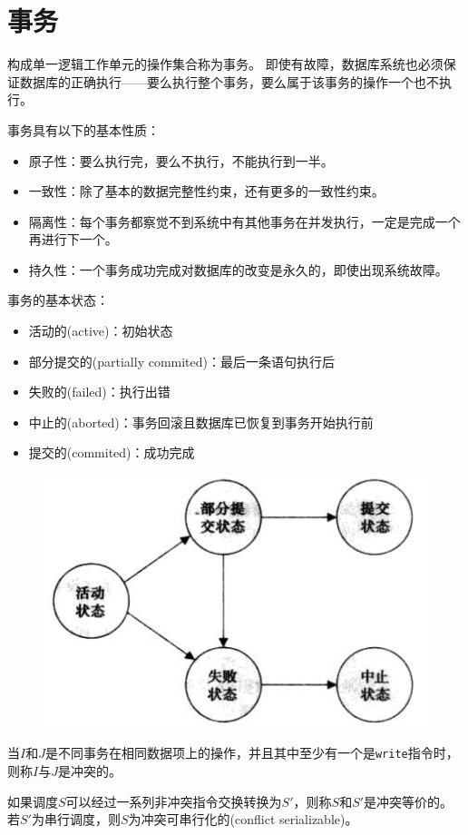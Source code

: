 
\section{事务} %
\begin{definition}[事务(transaction)]
构成单一逻辑工作单元的操作集合称为事务。
即使有故障，数据库系统也必须保证数据库的正确执行——要么执行整个事务，要么属于该事务的操作一个也不执行。
\end{definition}

事务具有以下的基本性质：
\begin{itemize}
	\item 原子性：要么执行完，要么不执行，不能执行到一半。
	\item 一致性：除了基本的数据完整性约束，还有更多的一致性约束。
	\item 隔离性：每个事务都察觉不到系统中有其他事务在并发执行，一定是完成一个再进行下一个。
	\item 持久性：一个事务成功完成对数据库的改变是永久的，即使出现系统故障。
\end{itemize}

事务的基本状态：
\begin{itemize}
	\item 活动的(active)：初始状态
	\item 部分提交的(partially commited)：最后一条语句执行后
	\item 失败的(failed)：执行出错
	\item 中止的(aborted)：事务回滚且数据库已恢复到事务开始执行前
	\item 提交的(commited)：成功完成
\end{itemize}
\begin{figure}[H]
\centering
\includegraphics[width=0.5\linewidth]{fig/transaction_state.png}
\end{figure}

\begin{definition}[冲突]
当$I$和$J$是不同事务在相同数据项上的操作，并且其中至少有一个是\verb'write'指令时，则称$I$与$J$是冲突的。
\end{definition}
\begin{definition}
如果调度$S$可以经过一系列非冲突指令交换转换为$S'$，则称$S$和$S'$是冲突等价的。
若$S'$为串行调度，则$S$为冲突可串行化的(conflict serializable)。
\end{definition}

